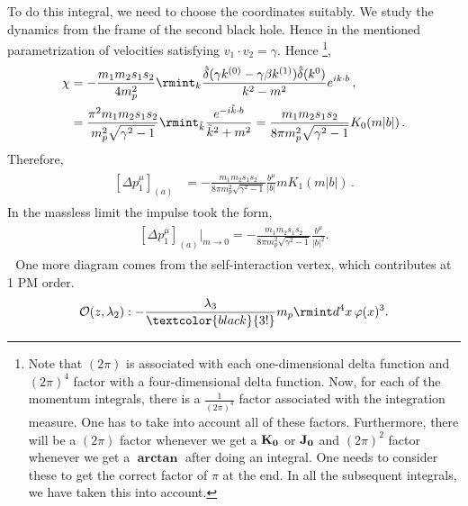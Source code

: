 To do this integral, we need to choose the coordinates suitably. We study the dynamics from the frame of the second black hole. Hence in the mentioned parametrization of velocities
satisfying $v_1\cdot v_2=\gamma$.
Hence \footnote{Note that $(2\pi)$ is associated with each one-dimensional delta function and $(2\pi)^4$ factor with a four-dimensional delta function. Now, for each of the momentum integrals, there is a $\frac{1}{(2\pi)^4}$ factor associated with the integration measure. One has to take into account all of these factors. Furthermore, there will be a $(2\pi)$ factor whenever we get a ${\bf K_0}$ or ${\bf J_0}$  and $(2\pi)^2$ factor whenever we get a $\boldsymbol{\arctan}$ after doing an integral. One needs to consider these to get the correct factor of $\pi$ at the end. In all the subsequent integrals, we have taken this into account. },
\begin{align}
    \begin{split}
    \chi&=-\frac{m_1m_2s_1s_2}{4m_p^2}\rmint_{k}\frac{\hat{\delta}{(\gamma k^{(0)}-\gamma\beta k^{(1)})}\hat\delta(k^{0})}{k^2-m^2}e^{ik\cdot b}\,,\\ &
    =\frac{\pi ^2 m_1m_2s_1s_2}{m_p^2\sqrt{\gamma^2-1}}
   \rmint_{\tilde k}\frac{e^{-i\tilde k \cdot b}}{\tilde k^2+m^2}=\frac{m_1m_2s_1s_2}{8\pi m_p^2\sqrt{\gamma^2-1}}K_{0}(m|b|)\,.
    \end{split}
\end{align}
Therefore,
\begin{align}
\begin{split} \label{e1:barwq2}
  [\Delta p_1^{\mu}]_{(a)}&=-\frac{m_1m_2s_1s_2}{8\pi m_p^2\sqrt{\gamma^2-1}} \frac{b^\mu}{|b|}m K_1(m|b|)\,.
\end{split}
\end{align} 
In the massless limit the impulse took the form,
\begin{align}
    \begin{split}
          [\Delta p_1^{\mu}]_{(a)}\Big|_{m\to 0}=-\frac{m_1m_2s_1s_2}{8\pi m_p^2\sqrt{\gamma^2-1}} \frac{b^\mu}{|b|^2}.
    \end{split}
\end{align}
\vspace{0.5cm}
\textbullet $\,\,$ One more diagram comes from the self-interaction vertex, which contributes at 1 PM order.
\begin{align}
    \begin{split}
        \mathcal{O}(z,\lambda_2):-\frac{\lambda_3}{\textcolor{black}{3!}} m_p\rmint d^4x\,\varphi(x)^3.
    \end{split}
\end{align}
